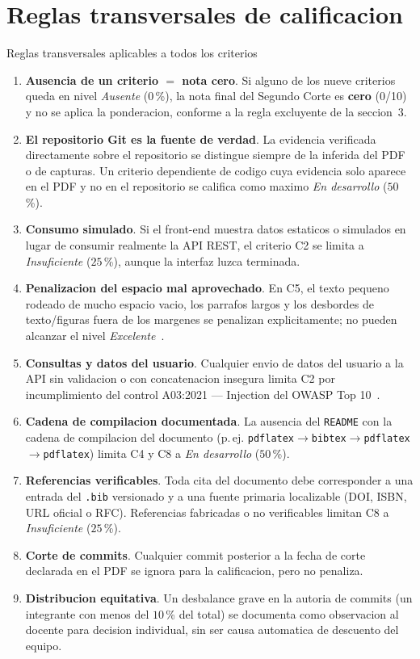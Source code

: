 \documentclass[11pt,a4paper]{article}
\begin{document}
\section{Reglas transversales de calificacion}

\begin{cajacritica}{Reglas transversales aplicables a todos los criterios}
	\begin{enumerate}
		\item \textbf{Ausencia de un criterio $=$ nota cero}. Si alguno de los nueve criterios queda en nivel \emph{Ausente} ($0$\,\%), la nota final del Segundo Corte es \textbf{cero} (0/10) y no se aplica la ponderacion, conforme a la regla excluyente de la seccion~3.
		\item \textbf{El repositorio Git es la fuente de verdad}. La evidencia verificada directamente sobre el repositorio se distingue siempre de la inferida del PDF o de capturas. Un criterio dependiente de codigo cuya evidencia solo aparece en el PDF y no en el repositorio se califica como maximo \emph{En desarrollo} ($50$\,\%).
		\item \textbf{Consumo simulado}. Si el front-end muestra datos estaticos o simulados en lugar de consumir realmente la API REST, el criterio C2 se limita a \emph{Insuficiente} ($25$\,\%), aunque la interfaz luzca terminada.
		\item \textbf{Penalizacion del espacio mal aprovechado}. En C5, el texto pequeno rodeado de mucho espacio vacio, los parrafos largos y los desbordes de texto/figuras fuera de los margenes se penalizan explicitamente; no pueden alcanzar el nivel \emph{Excelente}~\cite{mayer2009multimedia}.
		\item \textbf{Consultas y datos del usuario}. Cualquier envio de datos del usuario a la API sin validacion o con concatenacion insegura limita C2 por incumplimiento del control A03:2021 --- Injection del OWASP Top 10~\cite{owasp2021top10}.
		\item \textbf{Cadena de compilacion documentada}. La ausencia del \texttt{README} con la cadena de compilacion del documento (p.\,ej. \texttt{pdflatex$\to$bibtex$\to$pdflatex$\to$pdflatex}) limita C4 y C8 a \emph{En desarrollo} ($50$\,\%).
		\item \textbf{Referencias verificables}. Toda cita del documento debe corresponder a una entrada del \texttt{.bib} versionado y a una fuente primaria localizable (DOI, ISBN, URL oficial o RFC). Referencias fabricadas o no verificables limitan C8 a \emph{Insuficiente} ($25$\,\%).
		\item \textbf{Corte de commits}. Cualquier commit posterior a la fecha de corte declarada en el PDF se ignora para la calificacion, pero no penaliza.
		\item \textbf{Distribucion equitativa}. Un desbalance grave en la autoria de commits (un integrante con menos del $10$\,\% del total) se documenta como observacion al docente para decision individual, sin ser causa automatica de descuento del equipo.
	\end{enumerate}
\end{cajacritica}
\end{document}
